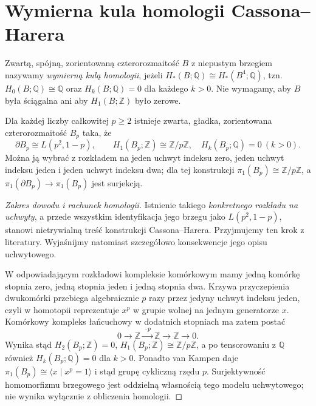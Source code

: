 \section{Wymierna kula homologii Cassona--Harera}
\label{sec:tg-rb-rational-ball}

\begin{definicja}
Zwartą, spójną, zorientowaną czterorozmaitość
$B$ z niepustym brzegiem nazywamy
\emph{wymierną kulą homologii}, jeżeli
$H_*(B;\mathbb Q)\cong H_*(B^4;\mathbb Q)$,
tzn. $H_0(B;\mathbb Q)\cong\mathbb Q$ oraz
$H_k(B;\mathbb Q)=0$ dla każdego $k>0$.
Nie wymagamy, aby $B$ była ściągalna ani
aby $H_1(B;\mathbb Z)$ było zerowe.
\end{definicja}

\begin{twierdzenie}
\label{thm:tg-rb-casson-harer}
Dla każdej liczby całkowitej $p\geq2$ istnieje
zwarta, gładka, zorientowana czterorozmaitość $B_p$
taka, że
\[
\partial B_p\cong L(p^2,1-p),\qquad
H_1(B_p;\mathbb Z)\cong\mathbb Z/p\mathbb Z,
\quad H_k(B_p;\mathbb Q)=0\ (k>0).
\]
Można ją wybrać z rozkładem na jeden uchwyt
indeksu zero, jeden uchwyt indeksu jeden i jeden
uchwyt indeksu dwa; dla tej konstrukcji
$\pi_1(B_p)\cong\mathbb Z/p\mathbb Z$, a
$\pi_1(\partial B_p)\to\pi_1(B_p)$ jest surjekcją.
\end{twierdzenie}

\begin{proof}[Zakres dowodu i rachunek homologii]
Istnienie takiego \emph{konkretnego rozkładu na uchwyty},
a przede wszystkim identyfikacja jego brzegu jako
$L(p^2,1-p)$, stanowi nietrywialną treść konstrukcji
Cassona--Harera. Przyjmujemy ten krok z literatury.
Wyjaśnijmy natomiast szczegółowo konsekwencje
jego opisu uchwytowego.

W odpowiadającym rozkładowi kompleksie komórkowym
mamy jedną komórkę stopnia zero, jedną stopnia jeden
i jedną stopnia dwa. Krzywa przyczepienia dwukomórki
przebiega algebraicznie $p$ razy przez jedyny
uchwyt indeksu jeden, czyli w homotopii reprezentuje $x^p$
w grupie wolnej na jednym generatorze $x$.
Komórkowy kompleks łańcuchowy w dodatnich stopniach
ma zatem postać
\[
0\longrightarrow\mathbb Z
\xrightarrow{\ \cdot p\ }\mathbb Z
\longrightarrow\mathbb Z\longrightarrow0.
\]
Wynika stąd $H_2(B_p;\mathbb Z)=0$,
$H_1(B_p;\mathbb Z)\cong\mathbb Z/p\mathbb Z$,
a po tensorowaniu z $\mathbb Q$ również
$H_k(B_p;\mathbb Q)=0$ dla $k>0$.
Ponadto van Kampen daje
$\pi_1(B_p)\cong\langle x\mid x^p=1\rangle$
i stąd grupę cykliczną rzędu $p$.
Surjektywność homomorfizmu brzegowego jest
oddzielną własnością tego modelu uchwytowego;
nie wynika wyłącznie z obliczenia homologii.
\end{proof}


